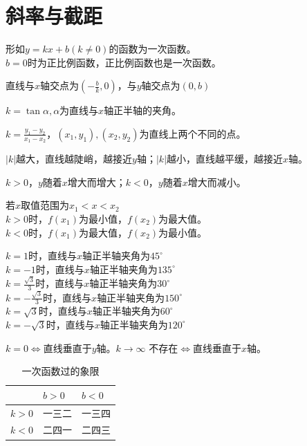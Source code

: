 \section{斜率与截距}
\begin{definition}
    形如$y=kx+b(k\ne 0)$的函数为一次函数。\\
    $b=0$时为正比例函数，正比例函数也是一次函数。
\end{definition}
\begin{theorem}
    直线与$x$轴交点为$(-\frac{b}{k},0)$，与$y$轴交点为$(0,b)$
\end{theorem}
\begin{theorem}
    $k=\tan \alpha,\alpha$为直线与$x$轴正半轴的夹角。
\end{theorem}
\begin{theorem}
    $k=\frac{y_1-y_2}{x_1-x_2}$，$(x_1,y_1),(x_2,y_2)$为直线上两个不同的点。
\end{theorem}
\begin{theorem}
    $|k|$越大，直线越陡峭，越接近$y$轴；$|k|$越小，直线越平缓，越接近$x$轴。
\end{theorem}
\begin{theorem}
    $k>0$，$y$随着$x$增大而增大；$k<0$，$y$随着$x$增大而减小。
\end{theorem}
\begin{theorem}
    若$x$取值范围为$x_1<x<x_2$ \\
    $k>0$时，$f(x_1)$为最小值，$f(x_2)$为最大值。 \\
    $k<0$时，$f(x_1)$为最大值，$f(x_2)$为最小值。
\end{theorem}
\begin{corollary}
    $k=1$时，直线与$x$轴正半轴夹角为$45^\circ$ \\
    $k=-1$时，直线与$x$轴正半轴夹角为$135^\circ$ \\
    $k=\frac{\sqrt3}{3}$时，直线与$x$轴正半轴夹角为$30^\circ$ \\
    $k=-\frac{\sqrt3}{3}$时，直线与$x$轴正半轴夹角为$150^\circ$ \\
    $k=\sqrt3$时，直线与$x$轴正半轴夹角为$60^\circ$ \\
    $k=-\sqrt3$时，直线与$x$轴正半轴夹角为$120^\circ$
\end{corollary}
\begin{corollary}
    $k=0\Leftrightarrow$直线垂直于$y$轴。$k\to \infty$ 不存在$\Leftrightarrow$直线垂直于$x$轴。
\end{corollary}
\begin{table}[ht]
    \centering
    \caption{一次函数过的象限}
    \begin{tabular}{l|l|l}
              & $b>0$ & $b<0$ \\
        \hline
        $k>0$ & 一三二   & 一三四   \\
        \hline
        $k<0$ & 二四一   & 二四三   \\
        \hline
    \end{tabular}
\end{table}
